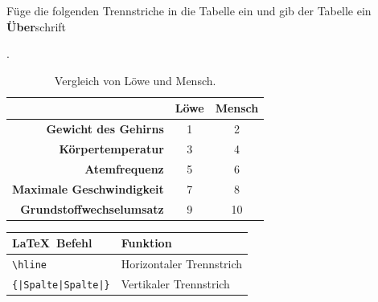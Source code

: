 \begin{frame}[fragile]
	\Aufgabee
		Füge die folgenden Trennstriche in die Tabelle ein und gib der Tabelle ein \textbf{Über}schrift
        
        \textrm{}.
	\begin{outputbox}
		\vspace{-0.4cm}
		\begin{center}
            \begin{table}[htbp]
                \centering
            	\caption{Vergleich von Löwe und Mensch.}
                \vspace{-0.4cm}
            	\begin{tabular}{r|cc}
            		\hline 
            		\textbf{} & \textbf{Löwe} & \textbf{Mensch} \\ \hline  
            		\textbf{Gewicht des Gehirns} & 1 & 2 \\  
            		\textbf{Körpertemperatur} & 3 & 4 \\  
            		\textbf{Atemfrequenz} & 5 & 6 \\ 
            		\textbf{Maximale Geschwindigkeit} & 7 & 8 \\  
            		\textbf{Grundstoffwechselumsatz} & 9 & 10 \\ \hline
            	\end{tabular} 
            	\label{}
            \end{table}
		\end{center}
		\vspace{-0.2cm}
	\end{outputbox}
	
	\btVFill\Befehle
	\begin{center}
		\begin{tabular}{ll}
			\toprule
			\LaTeX\ Befehl								&	Funktion								\\ \midrule
			\lstinline|\hline|							&	Horizontaler Trennstrich				\\
			\lstinline/{|Spalte|Spalte|}/				&	Vertikaler Trennstrich    				\\
			\bottomrule
		\end{tabular}
	\end{center}
	\vspace{0.1cm}
\end{frame}

